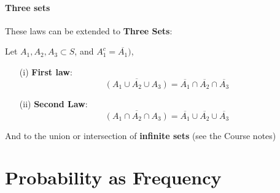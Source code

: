 \documentclass[notes=show]{beamer}\usepackage[]{graphicx}\usepackage[]{color}
\newcommand{\bea}{\begin{eqnarray}}
\newcommand{\eea}{\end{eqnarray}}
\begin{document}
\begin{frame}{\secname}
\framesubtitle{Three sets}

These laws can be extended to \textbf{Three Sets}:

Let $A_{1}, A_{2}, A_{3} \subset S$, and  $A^{c}_{1} = \overline{A_{1}})$,

\begin{itemize}
\item[(i)] \textbf{First law}:
$$\overline{\left(A_{1}\cup A_{2}\cup A_{3}\right)} = \overline{A_{1}} \cap \overline{A_{2}} \cap \overline{A_{3}}$$
\item[(ii)] \textbf{Second Law}:
$$\overline{\left(A_{1}\cap A_{2}\cap A_{3}\right)} = \overline{A_{1}} \cup \overline{A_{2}} \cup \overline{A_{3}}$$
\end{itemize}

And to the union or intersection of \textbf{infinite sets} (see the Course notes)
\end{frame}

%

%
%
%
%

\section{Probability as Frequency}
\end{document}
